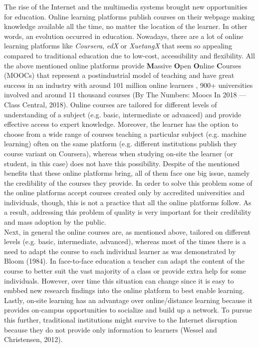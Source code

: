 \documentclass[11]{article}
\begin{document}
		\indent
		
  The rise of the Internet and the multimedia systems brought new opportunities for education. Online learning platforms publish courses on their webpage making knowledge available all the time, no matter the location of the learner. In other words, an evolution occurred in education. Nowadays, there are a lot of online learning platforms like \textit{Coursera}, \textit{edX} or \textit{XuetangX} that seem so appealing compared to traditional education due to low-cost, accessibility and flexibility. All the above mentioned online platforms provide \textbf{M}assive \textbf{O}pen \textbf{O}nline \textbf{C}ourses (MOOCs) that represent a postindustrial model of teaching and have great success in an industry with around 101 million online learners , 900+ universities involved and around 11 thousand courses (By The Numbers: Moocs In 2018 — Class Central, 2018). Online courses are tailored for different levels of understanding of a subject (e.g. basic, intermediate or advanced) and provide effective access to expert knowledge. Moreover, the learner has the option to  choose from a wide range of courses teaching a particular subject (e.g. machine learning) often on the same platform (e.g. different institutions publish they course variant on Coursera), whereas when studying on-site the learner (or student, in this case) does not have this possibility. Despite of the mentioned benefits that these online platforms bring, all of them face one big issue, namely the credibility of the courses they provide. In order to solve this problem some of the online platforms accept courses created only by accredited universities and individuals, though, this is not a practice that all the online platforms follow. As a result, addressing this problem of quality is very important for their credibility and mass adoption by the public.\\
Next, in general the online courses are, as mentioned above, tailored on different levels (e.g. basic, intermediate, advanced), whereas most of the times there is a need to adapt the course to each individual learner as was demonstrated by Bloom (1984). In face-to-face education a teacher can adapt the content of the course to better suit the vast majority of a class or provide extra help for some individuals. However, over time this situation can change since it is easy to embbed new research findings into the online platform to best enable learning.\\
Lastly,  on-site learning has an advantage over online/distance learning because it provides on-campus opportunities to socialize and build up a network. To pursue this further, traditional institutions might survive to the Internet disruption because they do not provide only information to learners (Wessel and Christensen, 2012). \\
\end{document}
